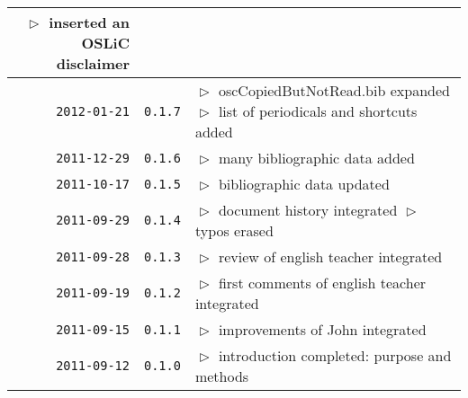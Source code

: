 \begin{table}
\begin{center}
\begin{tabular}{|r|c|p{10cm}|}
    $\vartriangleright$ inserted an OSLiC disclaimer\\
\hline
    \texttt{2012-01-21}
  & \texttt{0.1.7} 
  & $\vartriangleright$ oscCopiedButNotRead.bib expanded\newline 
  $\vartriangleright$ list of periodicals and shortcuts added\\
\hline
    \texttt{2011-12-29}
  & \texttt{0.1.6} 
  & $\vartriangleright$ many bibliographic data added\\
\hline
    \texttt{2011-10-17}
  & \texttt{0.1.5} 
  & $\vartriangleright$ bibliographic data updated\\
\hline
    \texttt{2011-09-29}
  & \texttt{0.1.4} 
  & $\vartriangleright$ document history integrated\newline
    $\vartriangleright$ typos erased\\
\hline
    \texttt{2011-09-28}
  & \texttt{0.1.3} 
  & $\vartriangleright$ review of english teacher integrated \\
\hline
    \texttt{2011-09-19}
  & \texttt{0.1.2} 
  & $\vartriangleright$ first comments of english teacher integrated \\
\hline
    \texttt{2011-09-15}
  & \texttt{0.1.1} 
  & $\vartriangleright$ improvements of John integrated\\
\hline
    \texttt{2011-09-12}
  & \texttt{0.1.0} 
  & $\vartriangleright$ introduction completed: purpose and methods \\
\hline
\hline 
\end{tabular}
\end{center}
\end{table}


%
